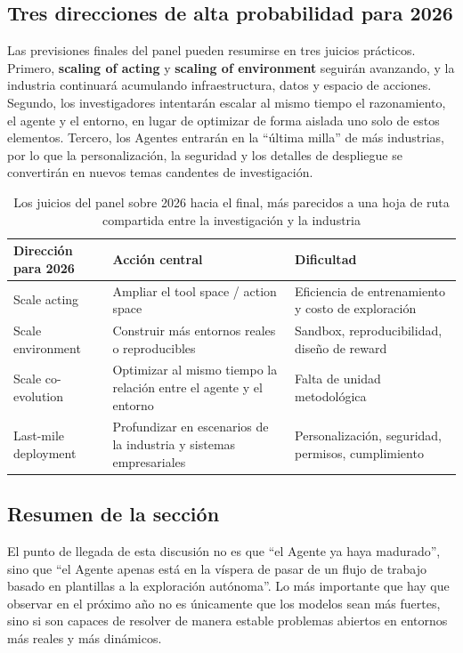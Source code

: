 \documentclass[a4paper]{article}
\begin{document}
\subsection{Tres direcciones de alta probabilidad para 2026}
Las previsiones finales del panel pueden resumirse en tres juicios prácticos. Primero, \textbf{scaling of acting} y \textbf{scaling of environment} seguirán avanzando, y la industria continuará acumulando infraestructura, datos y espacio de acciones. Segundo, los investigadores intentarán escalar al mismo tiempo el razonamiento, el agente y el entorno, en lugar de optimizar de forma aislada uno solo de estos elementos. Tercero, los Agentes entrarán en la ``última milla'' de más industrias, por lo que la personalización, la seguridad y los detalles de despliegue se convertirán en nuevos temas candentes de investigación.

\begin{table}[H]
\centering
\begin{tabular}{p{3.1cm}p{4.1cm}p{4.4cm}}
\toprule
\textbf{Dirección para 2026} & \textbf{Acción central} & \textbf{Dificultad} \\
\midrule
Scale acting & Ampliar el tool space / action space & Eficiencia de entrenamiento y costo de exploración \\
Scale environment & Construir más entornos reales o reproducibles & Sandbox, reproducibilidad, diseño de reward \\
Scale co-evolution & Optimizar al mismo tiempo la relación entre el agente y el entorno & Falta de unidad metodológica \\
Last-mile deployment & Profundizar en escenarios de la industria y sistemas empresariales & Personalización, seguridad, permisos, cumplimiento \\
\bottomrule
\end{tabular}
\caption{Los juicios del panel sobre 2026 hacia el final, más parecidos a una hoja de ruta compartida entre la investigación y la industria}
\end{table}

\subsection{Resumen de la sección}
El punto de llegada de esta discusión no es que ``el Agente ya haya madurado'', sino que ``el Agente apenas está en la víspera de pasar de un flujo de trabajo basado en plantillas a la exploración autónoma''. Lo más importante que hay que observar en el próximo año no es únicamente que los modelos sean más fuertes, sino si son capaces de resolver de manera estable problemas abiertos en entornos más reales y más dinámicos.
\end{document}
